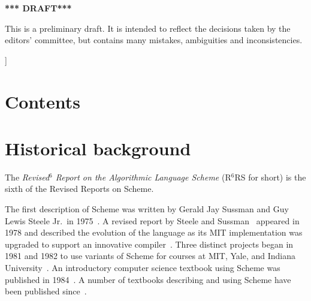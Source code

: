 \documentclass[twoside,twocolumn]{algol60}
\newcommand{\rn}[1]{R$^{#1}$RS}
\begin{document}
{\bigskip

\begin{center}
{\large \bf
*** DRAFT*** \\
}\end{center}

This is a preliminary draft.  It is intended to reflect the decisions
taken by the editors' committee, but contains many mistakes,
ambiguities and inconsistencies.

}]

\texonly\clearpage\endtexonly

\chapter*{Contents}
\addvspace{3.5pt}                  %
\renewcommand{\tocshrink}{-4.0pt}  %
{%
\tableofcontents
}

\vfill

\texonly\clearpage\endtexonly


\chapter{Historical background}

The \textit{Revised$^6$ Report on the Algorithmic Language Scheme}
(\rn{6} for short) is the sixth of the Revised Reports on Scheme.

\vest The first description of Scheme was written by Gerald Jay
Sussman and Guy Lewis Steele Jr.\ in
1975~\cite{Scheme75}.  A revised report by Steele and
Sussman~\cite{Scheme78}
appeared in 1978 and described the evolution
of the language as its MIT implementation was upgraded to support an
innovative compiler~\cite{Rabbit}.  Three distinct projects began in
1981 and 1982 to use variants of Scheme for courses at MIT, Yale, and
Indiana University~\cite{Rees82,MITScheme,Scheme311}.  An introductory
computer science textbook using Scheme was published in
1984~\cite{SICP}.  A number of textbooks describing and using Scheme
have been published since~\cite{tspl3}.
\end{document}

